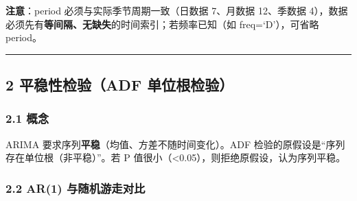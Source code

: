 \textbf{注意}：period 必须与实际季节周期一致（日数据 7、月数据
12、季数据
4），数据必须先有\textbf{等间隔、无缺失}的时间索引；若频率已知（如
freq=`D'），可省略 period。

\begin{center}\rule{0.5\linewidth}{0.5pt}\end{center}

\subsection{2 平稳性检验（ADF
单位根检验）}\label{ux5e73ux7a33ux6027ux68c0ux9a8cadf-ux5355ux4f4dux6839ux68c0ux9a8c}

\subsubsection{2.1 概念}\label{ux6982ux5ff5-3}

ARIMA 要求序列\textbf{平稳}（均值、方差不随时间变化）。ADF
检验的原假设是``序列存在单位根（非平稳）''。若 P
值很小（\textless0.05），则拒绝原假设，认为序列平稳。

\subsubsection{2.2 AR(1)
与随机游走对比}\label{ar1-ux4e0eux968fux673aux6e38ux8d70ux5bf9ux6bd4}

